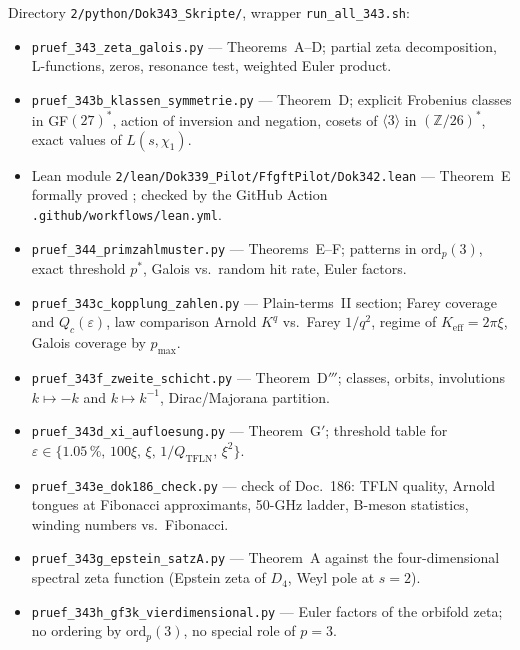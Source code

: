 Directory \texttt{2/python/Dok343\_Skripte/}, wrapper \texttt{run\_all\_343.sh}:
\begin{itemize}
  \item \texttt{pruef\_343\_zeta\_galois.py} ---
        Theorems~A--D; partial zeta decomposition, L-functions, zeros,
        resonance test, weighted Euler product.
  \item \texttt{pruef\_343b\_klassen\_symmetrie.py} ---
        Theorem~D; explicit Frobenius classes in GF$(27)^*$, action of inversion
        and negation, cosets of $\langle 3\rangle$ in $(\mathbb{Z}/26)^*$,
        exact values of $L(s,\chi_1)$.
  \item Lean module \texttt{2/\allowbreak lean/\allowbreak Dok339\_Pilot/\allowbreak FfgftPilot/\allowbreak Dok342.lean} ---
        Theorem~E formally proved \LM; checked by the GitHub Action
        \texttt{.github/\allowbreak workflows/\allowbreak lean.yml}.
  \item \texttt{pruef\_344\_primzahlmuster.py} ---
        Theorems~E--F; patterns in $\mathrm{ord}_p(3)$, exact threshold $p^*$,
        Galois vs.\ random hit rate, Euler factors.
  \item \texttt{pruef\_343c\_kopplung\_zahlen.py} ---
        Plain-terms~II section; Farey coverage and $Q_c(\varepsilon)$, law comparison
        Arnold $K^q$ vs.\ Farey $1/q^2$, regime of $K_\mathrm{eff}=2\pi\xi$,
        Galois coverage by $p_\mathrm{max}$.
  \item \texttt{pruef\_343f\_zweite\_schicht.py} --- Theorem~D$'''$; classes, orbits,
        involutions $k\mapsto-k$ and $k\mapsto k^{-1}$, Dirac/Majorana partition.
  \item \texttt{pruef\_343d\_xi\_aufloesung.py} --- Theorem~G$'$; threshold table for
        $\varepsilon\in\{1.05\,\%,\,100\xi,\,\xi,\,1/Q_\mathrm{TFLN},\,\xi^2\}$.
  \item \texttt{pruef\_343e\_dok186\_check.py} --- check of Doc.~186: TFLN quality,
        Arnold tongues at Fibonacci approximants, 50-GHz ladder, B-meson statistics,
        winding numbers vs.\ Fibonacci.
  \item \texttt{pruef\_343g\_epstein\_satzA.py} --- Theorem~A against the four-dimensional
        spectral zeta function (Epstein zeta of $D_4$, Weyl pole at $s=2$).
  \item \texttt{pruef\_343h\_gf3k\_vierdimensional.py} --- Euler factors of the
        orbifold zeta; no ordering by $\mathrm{ord}_p(3)$, no special role of $p=3$.
\end{itemize}


